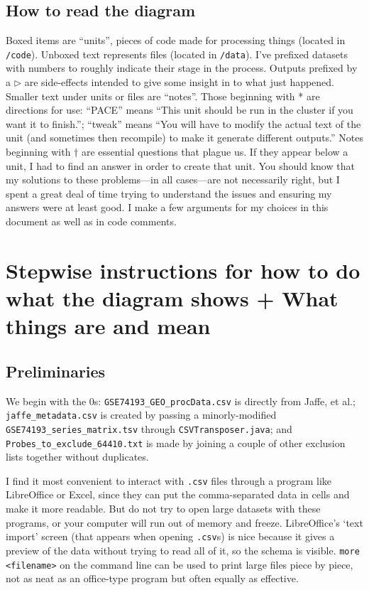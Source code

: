 \documentclass[]{article}
\begin{document}
  \subsection{How to read the diagram}
  Boxed items are ``units'', pieces of code made for processing things (located in \texttt{/code}). Unboxed text represents files (located in \texttt{/data}). I've prefixed datasets with numbers to roughly indicate their stage in the process. Outputs prefixed by a $\triangleright$ are side-effects intended to give some insight in to what just happened. Smaller text under units or files are ``notes''. Those beginning with * are directions for use: ``PACE'' means ``This unit should be run in the cluster if you want it to finish.''; ``tweak'' means ``You will have to modify the actual text of the unit (and sometimes then recompile) to make it generate different outputs.'' Notes beginning with $\dagger$ are essential questions that plague us. If they appear below a unit, I had to find an answer in order to create that unit. You should know that my solutions to these problems---in all cases---are not necessarily right, but I spent a great deal of time trying to understand the issues and ensuring my answers were at least good. I make a few arguments for my choices in this document as well as in code comments.

  \section{Stepwise instructions for how to do what the diagram shows + What things are and mean}
  \subsection{Preliminaries}
  We begin with the 0s: \texttt{GSE74193\_GEO\_procData.csv} is directly from Jaffe, et al.; \texttt{jaffe\_metadata.csv} is created by passing a minorly-modified \texttt{GSE74193\_series\_matrix.tsv} through \texttt{CSVTransposer.java}; and \texttt{Probes\_to\_exclude\_64410.txt} is made by joining a couple of other exclusion lists together without duplicates.

  I find it most convenient to interact with \texttt{.csv} files through a program like LibreOffice or Excel, since they can put the comma-separated data in cells and make it more readable. But do not try to open large datasets with these programs, or your computer will run out of memory and freeze. LibreOffice's `text import' screen (that appears when opening \texttt{.csv}s) is nice because it gives a preview of the data without trying to read all of it, so the schema is visible. \texttt{more <filename>} on the command line can be used to print large files piece by piece, not as neat as an office-type program but often equally as effective.
\end{document}
